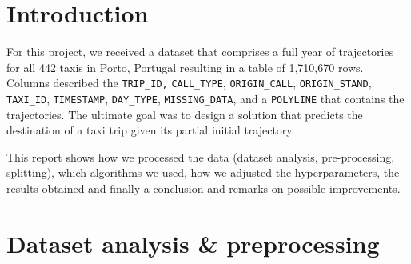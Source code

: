\documentclass[12pt, titlepage]{article}
\begin{document}
\tableofcontents


\newpage


\section{Introduction}

For this project, we received a dataset that comprises a full year of trajectories for all 442 taxis in Porto, Portugal resulting in a table of 1,710,670 rows. Columns described the \texttt{TRIP\_ID,} \texttt{CALL\_TYPE}, \texttt{ORIGIN\_CALL}, \texttt{ORIGIN\_STAND}, \texttt{TAXI\_ID}, \texttt{TIMESTAMP}, \texttt{DAY\_TYPE}, \texttt{MISSING\_DATA}, and a \texttt{POLYLINE} that contains the trajectories. The ultimate goal was to design a solution that predicts the destination of a taxi trip given its partial initial trajectory.

This report shows how we processed the data (dataset analysis, pre-processing, splitting), which algorithms we used, how we adjusted the hyperparameters, the results obtained and finally a conclusion and remarks on possible improvements.

\section{Dataset analysis \& preprocessing}
\end{document}
